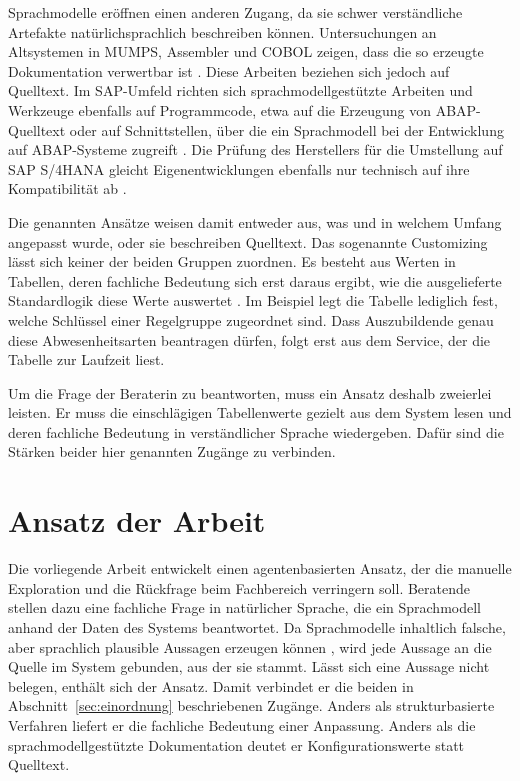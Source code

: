 Sprachmodelle eröffnen einen anderen Zugang, da sie schwer verständliche Artefakte natürlichsprachlich beschreiben können. Untersuchungen an Altsystemen in MUMPS, Assembler und COBOL zeigen, dass die so erzeugte Dokumentation verwertbar ist \cite{diggs_leveraging_2024, latreche_llm-assisted_2026}. Diese Arbeiten beziehen sich jedoch auf Quelltext. Im SAP-Umfeld richten sich sprachmodellgestützte Arbeiten und Werkzeuge ebenfalls auf Programmcode, etwa auf die Erzeugung von ABAP-Quelltext \cite{wallraven_benchmarking_2026} oder auf Schnittstellen, über die ein Sprachmodell bei der Entwicklung auf ABAP-Systeme zugreift \cite{andreschak_mcp_abap_adt, fr0ster_mcp_abap_adt}. Die Prüfung des Herstellers für die Umstellung auf SAP S/4HANA gleicht Eigenentwicklungen ebenfalls nur technisch auf ihre Kompatibilität ab \cite{sap_ccm_atc}.
 
Die genannten Ansätze weisen damit entweder aus, was und in welchem Umfang angepasst wurde, oder sie beschreiben Quelltext. Das sogenannte Customizing lässt sich keiner der beiden Gruppen zuordnen. Es besteht aus Werten in Tabellen, deren fachliche Bedeutung sich erst daraus ergibt, wie die ausgelieferte Standardlogik diese Werte auswertet \cite{brehm_tailoring_2001}. %
Im Beispiel legt die Tabelle lediglich fest, welche Schlüssel einer Regelgruppe zugeordnet sind. Dass Auszubildende genau diese Abwesenheitsarten beantragen dürfen, folgt erst aus dem Service, der die Tabelle zur Laufzeit liest.

Um die Frage der Beraterin zu beantworten, muss ein Ansatz deshalb zweierlei leisten. Er muss die einschlägigen Tabellenwerte gezielt aus dem System lesen und deren fachliche Bedeutung in verständlicher Sprache wiedergeben. Dafür sind die Stärken beider hier genannten Zugänge zu verbinden.


\section{Ansatz der Arbeit}
\label{sec:ansatz}
 
Die vorliegende Arbeit entwickelt einen agentenbasierten Ansatz, der die manuelle Exploration und die Rückfrage beim Fachbereich verringern soll. Beratende stellen dazu eine fachliche Frage in natürlicher Sprache, die ein Sprachmodell anhand der Daten des Systems beantwortet. Da Sprachmodelle inhaltlich falsche, aber sprachlich plausible Aussagen erzeugen können \cite{ji_survey_2023}, wird jede Aussage an die Quelle im System gebunden, aus der sie stammt. Lässt sich eine Aussage nicht belegen, enthält sich der Ansatz. Damit verbindet er die beiden in Abschnitt~\ref{sec:einordnung} beschriebenen Zugänge. Anders als strukturbasierte Verfahren liefert er die fachliche Bedeutung einer Anpassung. Anders als die sprachmodellgestützte Dokumentation deutet er Konfigurationswerte statt Quelltext.
 
